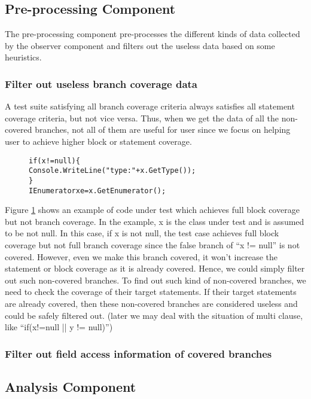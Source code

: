 \subsection{Pre-processing Component}
The pre-processing component pre-processes the different kinds of data collected by the observer component and filters out the useless data based on some heuristics.
\subsubsection{Filter out useless branch coverage data}
A test suite satisfying all branch coverage criteria always satisfies all statement coverage criteria, but not vice versa. Thus, when we get the data of all the non-covered branches, not all of them are useful for user since we focus on helping user to achieve higher block or statement coverage. 
\begin{figure}
\begin{CodeOut}
\begin{alltt}
    if (x != null) \{
  	   Console.WriteLine("type: " + x.GetType());
    \}
    IEnumerator xe = x.GetEnumerator();
\end{alltt}
\end{CodeOut}
\label{fig:useless1}
\end{figure}
Figure \ref{fig:useless1} shows an example of code under test which achieves full block coverage but not branch coverage. In the example, x is the class under test and is assumed to be not null. In this case, if x is not null, the test case achieves full block coverage but not full branch coverage since the false branch of ``x != null'' is not covered. However, even we make this branch covered, it won't increase the statement or block coverage as it is already covered. Hence, we could simply filter out such non-covered branches. To find out such kind of non-covered branches, we need to check the coverage of their target statements. If their target statements are already covered, then these non-covered branches are considered useless and could be safely filtered out. (later we may deal with the situation of multi clause, like ``if(x!=null || y != null)'')
\subsubsection{Filter out field access information of covered branches}

\subsection{Analysis Component}


